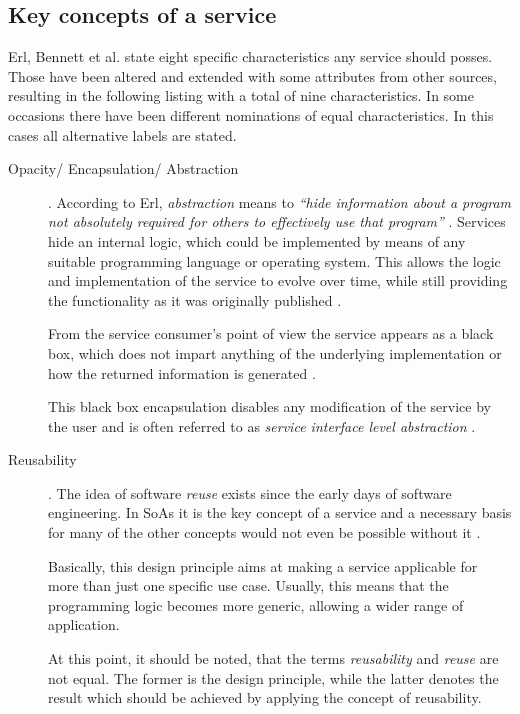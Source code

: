 \subsection{Key concepts of a service}
\label{sec:service-concepts}
Erl, Bennett et al. \cite[p.27]{erl2011} state eight specific characteristics any service should posses. Those have been altered and extended with some attributes from other sources, resulting in the following listing with a total of nine characteristics. In some occasions there have been different nominations of equal characteristics. In this cases all alternative labels are stated.

\begin{description}
\item [Opacity/ Encapsulation/ Abstraction] .
According to Erl, \emph{abstraction} means to \emph{``hide information about a program not absolutely required for others to effectively use that program''} \cite[ch.8.1.]{erl2008}.
Services hide an internal logic, which could be implemented by means of any suitable programming language or operating system. This allows the logic and implementation of the service to evolve over time, while still providing the functionality as it was originally published \cite[ch.8.1]{erl2008}.

From the service consumer's point of view the service appears as a black box, which does not impart anything of the underlying implementation or how the returned information is generated \cite{opengroup} \cite{breivold} \cite{arrowhead} \cite[p.27]{erl2011}.

This black box encapsulation disables any modification of the service by the user and is often referred to as \emph{service interface level abstraction} \cite{breivold}.

\item [Reusability].
The idea of software \emph{reuse} exists since the early days of software engineering. In SoAs it is the key concept of a service and a necessary basis for many of the other concepts would not even be possible without it \cite[ch.9.1.]{erl2008} \cite[p.27]{erl2011}.

Basically, this design principle aims at making a service applicable for more than just one specific use case. Usually, this means that the programming logic becomes more generic, allowing a wider range of application.

At this point, it should be noted, that the terms \emph{reusability} and \emph{reuse} are not equal. The former is the design principle, while the latter denotes the result which should be achieved by applying the concept of reusability.


\end{description}
